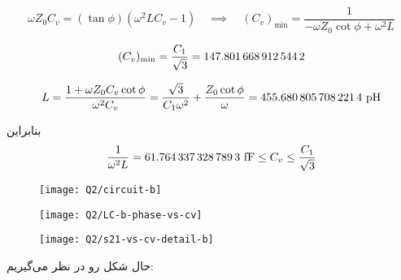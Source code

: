 \documentclass[12pt,onecolumn,a4paper]{article}
\begin{document}
\begin{equation}
	\omega Z_0 C_v = (\tan\phi)(\omega^2 L  C_v - 1)
	\quad\implies\quad
	 (C_v)_{\min} = \frac{1}{-\omega Z_0 \cot\phi + \omega^2 L } 
\end{equation}


\begin{equation}
	(C_v)_{\min} = \frac{C_1}{\sqrt{3}} = \num{\fpeval{1e15*\Cl/sqrt(3)}}
\end{equation}


\def\myphi{pi/4}
\begin{equation}
	L = \frac{1 + \omega Z_0 C_v \cot\phi}{\omega^2 C_v} = \frac{\sqrt{3}}{C_1 \omega^2} + \frac{Z_0\cot\phi}{\omega}
	= 	\num{\fpeval{1e12*(sqrt(3)/(\Cl*((2*pi*\fo)^2)) + (50*cot(\myphi))/(2*pi*\fo))}} \ \text{pH}
\end{equation}

بنابراین 
\begin{equation}
	\frac{1}{\omega^2L} = \num{\fpeval{1e15/(455.68e-12*(2*pi*\fo)^2)}} \ \text{fF} \le C_v \le \frac{C_1}{\sqrt3}
\end{equation}
%

\begin{figure}[H]
	\centering
	\texttt{[image: Q2/circuit-b]}
	\caption{}
	\label{fig:circuit-b}
\end{figure}

\begin{figure}[H]
	\centering
	\texttt{[image: Q2/LC-b-phase-vs-cv]}
	\caption{}
	\label{fig:lc-b-phase-vs-cv}
\end{figure}

\begin{figure}[H]
	\centering
	\texttt{[image: Q2/s21-vs-cv-detail-b]}
	\caption{}
	\label{fig:s21-vs-cv-detail-b}
\end{figure}


حال شکل  رو در نظر می‌گیریم:
\end{document}
